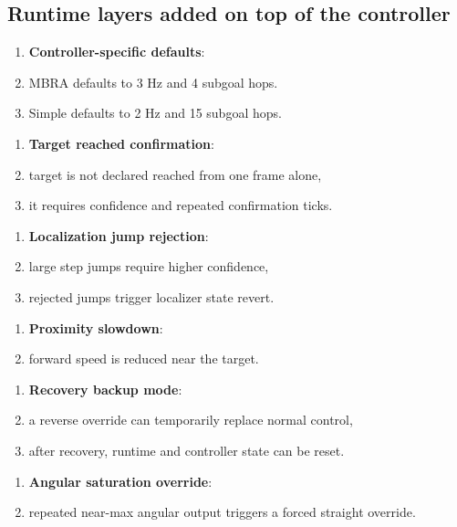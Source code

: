 \documentclass[11pt,a4paper]{article}
\begin{document}
\subsection{Runtime layers added on top of the controller}

\begin{enumerate}[nosep]
  \item \textbf{Controller-specific defaults}:
  \item MBRA defaults to 3 Hz and 4 subgoal hops.
  \item Simple defaults to 2 Hz and 15 subgoal hops.
\end{enumerate}

\begin{enumerate}
  \item \textbf{Target reached confirmation}:
  \item target is not declared reached from one frame alone,
  \item it requires confidence and repeated confirmation ticks.
\end{enumerate}

\begin{enumerate}
  \item \textbf{Localization jump rejection}:
  \item large step jumps require higher confidence,
  \item rejected jumps trigger localizer state revert.
\end{enumerate}

\begin{enumerate}
  \item \textbf{Proximity slowdown}:
  \item forward speed is reduced near the target.
\end{enumerate}

\begin{enumerate}
  \item \textbf{Recovery backup mode}:
  \item a reverse override can temporarily replace normal control,
  \item after recovery, runtime and controller state can be reset.
\end{enumerate}

\begin{enumerate}
  \item \textbf{Angular saturation override}:
  \item repeated near-max angular output triggers a forced straight override.
\end{enumerate}
\end{document}
